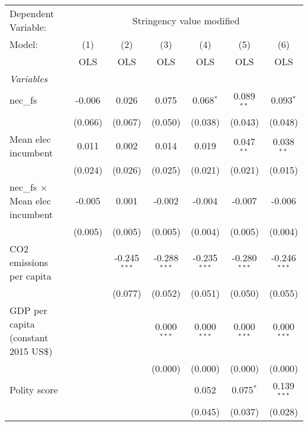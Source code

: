 
\begingroup
\centering
\begin{tabular}{lcccccc}
   \toprule
   Dependent Variable: & \multicolumn{6}{c}{Stringency value modified}\\
   Model:                                 & (1)     & (2)            & (3)            & (4)            & (5)            & (6)\\  
                                          &  OLS    & OLS            & OLS            & OLS            & OLS            & OLS\\  
   \midrule
   \emph{Variables}\\
   nec\_fs                                & -0.006  & 0.026          & 0.075          & 0.068$^{*}$    & 0.089$^{**}$   & 0.093$^{*}$\\   
                                          & (0.066) & (0.067)        & (0.050)        & (0.038)        & (0.043)        & (0.048)\\   
   Mean elec incumbent                    & 0.011   & 0.002          & 0.014          & 0.019          & 0.047$^{**}$   & 0.038$^{**}$\\   
                                          & (0.024) & (0.026)        & (0.025)        & (0.021)        & (0.021)        & (0.015)\\   
   nec\_fs $\times$ Mean elec incumbent   & -0.005  & 0.001          & -0.002         & -0.004         & -0.007         & -0.006\\   
                                          & (0.005) & (0.005)        & (0.005)        & (0.004)        & (0.005)        & (0.004)\\   
   CO2 emissions per capita               &         & -0.245$^{***}$ & -0.288$^{***}$ & -0.235$^{***}$ & -0.280$^{***}$ & -0.246$^{***}$\\   
                                          &         & (0.077)        & (0.052)        & (0.051)        & (0.050)        & (0.055)\\   
   GDP per capita (constant 2015 US\$)    &         &                & 0.000$^{***}$  & 0.000$^{***}$  & 0.000$^{***}$  & 0.000$^{***}$\\   
                                          &         &                & (0.000)        & (0.000)        & (0.000)        & (0.000)\\   
   Polity score                           &         &                &                & 0.052          & 0.075$^{*}$    & 0.139$^{***}$\\   
                                          &         &                &                & (0.045)        & (0.037)        & (0.028)\\   

\end{tabular}
